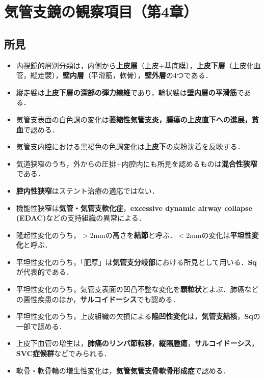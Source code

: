 
\section{気管支鏡の観察項目（第4章）}
\subsection{所見}
\begin{itemize}

\item 内視鏡的層別分類は，内側から\textbf{上皮層}（上皮+基底膜），\textbf{上皮下層}（上皮化血管，縦走襞），\textbf{壁内層}（平滑筋，軟骨），\textbf{壁外層}の4つである．

\item 縦走襞は\textbf{上皮下層の深部の弾力線維}であり，輪状襞は\textbf{壁内層の平滑筋}である．

\item 気管支表面の白色調の変化は\textbf{萎縮性気管支炎，腫瘍の上皮直下への進展，貧血}で認める．
\item 気管支内腔における黒褐色の色調変化は\textbf{上皮下}の炭粉沈着を反映する．
\item 気道狭窄のうち，外からの圧排+内腔内にも所見を認めるものは\textbf{混合性狭窄}である．
\item \textbf{腔内性狭窄}はステント治療の適応ではない．
\item 機能性狭窄は\textbf{気管・気管支軟化症}，\textbf{excessive dynamic airway collapse (EDAC)}などの支持組織の異常による．

\item 隆起性変化のうち，$>$2mmの高さを\textbf{結節}と呼ぶ．$<$2mmの変化は\textbf{平坦性変化}と呼ぶ．
\item 平坦性変化のうち，「肥厚」は\textbf{気管支分岐部}における所見として用いる．\textbf{Sq}が代表的である．
\item 平坦性変化のうち，気管支表面の凹凸不整な変化を\textbf{顆粒状}とよぶ．肺癌などの悪性疾患のほか，\textbf{サルコイドーシス}でも認める．
\item 平坦性変化のうち，上皮組織の欠損による\textbf{陥凹性変化}は，\textbf{気管支結核}，\textbf{Sq}の一部で認める．

\item 上皮下血管の増生は，\textbf{肺癌のリンパ節転移}，\textbf{縦隔腫瘍}，\textbf{サルコイドーシス}，\textbf{SVC症候群}などでみられる．
\item 軟骨・軟骨輪の増生性変化は，\textbf{気管気管支骨軟骨形成症}で認める．

\end{itemize}
